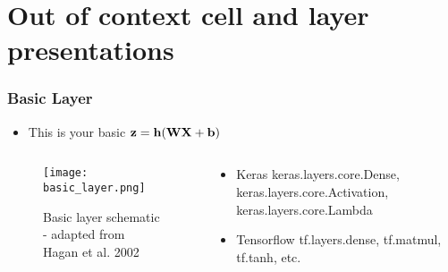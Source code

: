 \documentclass{beamer}
\begin{document}
\section{Out of context cell and layer presentations}
\begin{frame}
	\frametitle{Basic Layer}
    \begin{itemize}
    \item This is your basic $\vb{z = h(WX+b)}$
    \end{itemize}
    \begin{columns}[T]
     \begin{column}{.5\textwidth}
    \begin{block}{}
    \begin{figure}
		\texttt{[image: basic\_layer.png]}
		\caption{Basic layer schematic - adapted from Hagan et al. 2002}
	 \end{figure}
    \end{block}
    \end{column}
    \begin{column}{.5\textwidth}
    \begin{block}{}
    \begin{itemize}
    	\item Keras
        keras.layers.core.Dense, keras.layers.core.Activation, keras.layers.core.Lambda
        \item Tensorflow
        tf.layers.dense, tf.matmul, tf.tanh, etc.
    \end{itemize}
    \end{block}
    \end{column}
    \end{columns}
\end{frame}
\end{document}
